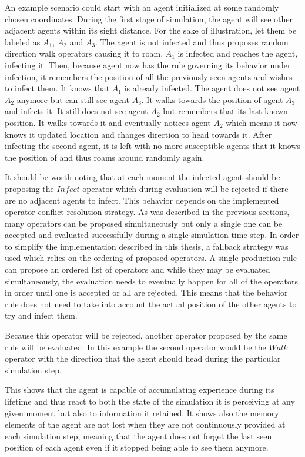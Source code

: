 An example scenario could start with an agent initialized at some randomly chosen coordinates.
During the first stage of simulation, the agent will see other adjacent agents within its sight distance.
For the sake of illustration, let them be labeled as $A_1$, $A_2$ and $A_3$.
The agent is not infected and thus proposes random direction walk operators causing it to roam.
$A_1$ is infected and reaches the agent, infecting it.
Then, because agent now has the rule governing its behavior under infection, it remembers the position of all the previously seen agents and wishes to infect them.
It knows that $A_1$ is already infected.
The agent does not see agent $A_2$ anymore but can still see agent $A_3$.
It walks towards the position of agent $A_3$ and infects it.
It still does not see agent $A_2$ but remembers that its last known position.
It walks towards it and eventually notices agent $A_2$ which means it now knows it updated location and changes direction to head towards it.
After infecting the second agent, it is left with no more susceptible agents that it knows the position of and thus roams around randomly again.

It should be worth noting that at each moment the infected agent should be proposing the $Infect$ operator which during evaluation will be rejected if there are no adjacent agents to infect.
This behavior depends on the implemented operator conflict resolution strategy.
As was described in the previous sections, many operators can be proposed simultaneously but only a single one can be accepted and evaluated successfully during a single simulation time-step.
In order to simplify the implementation described in this thesis, a fallback strategy was used which relies on the ordering of proposed operators.
A single production rule can propose an ordered list of operators and while they may be evaluated simultaneously, the evaluation needs to eventually happen for all of the operators in order until one is accepted or all are rejected.
This means that the behavior rule does not need to take into account the actual position of the other agents to try and infect them.

Because this operator will be rejected, another operator proposed by the same rule will be evaluated.
In this example the second operator would be the $Walk$ operator with the direction that the agent should head during the particular simulation step.

This shows that the agent is capable of accumulating experience during its lifetime and thus react to both the state of the simulation it is perceiving at any given moment but also to information it retained.
It shows also the memory elements of the agent are not lost when they are not continuously provided at each simulation step, meaning that the agent does not forget the last seen position of each agent even if it stopped being able to see them anymore.

